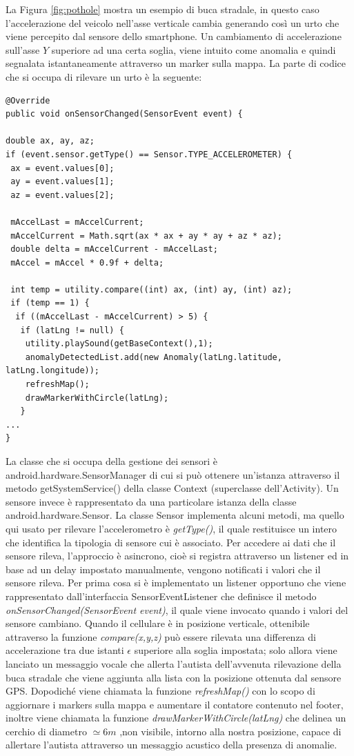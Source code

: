 \documentclass[a4paper, 11pt]{article} %
\begin{document}
La Figura \ref{fig:pothole} mostra un esempio di buca stradale, in questo caso l'accelerazione del veicolo nell'asse verticale cambia generando così un urto che viene percepito dal sensore dello smartphone. Un cambiamento di accelerazione sull'asse $Y$ superiore ad una certa soglia, viene intuito come anomalia e quindi segnalata istantaneamente attraverso un marker sulla mappa. La parte di codice che si occupa di rilevare un urto è la seguente: 
\begin{lstlisting}
@Override
public void onSensorChanged(SensorEvent event) {

double ax, ay, az;
if (event.sensor.getType() == Sensor.TYPE_ACCELEROMETER) {
 ax = event.values[0];
 ay = event.values[1];
 az = event.values[2];
 
 mAccelLast = mAccelCurrent;
 mAccelCurrent = Math.sqrt(ax * ax + ay * ay + az * az);
 double delta = mAccelCurrent - mAccelLast;
 mAccel = mAccel * 0.9f + delta;

 int temp = utility.compare((int) ax, (int) ay, (int) az);
 if (temp == 1) {
  if ((mAccelLast - mAccelCurrent) > 5) {
   if (latLng != null) {
    utility.playSound(getBaseContext(),1);
    anomalyDetectedList.add(new Anomaly(latLng.latitude, latLng.longitude));
    refreshMap();
    drawMarkerWithCircle(latLng);
   }
...
}
\end{lstlisting} 
La classe che si occupa della gestione dei sensori è android.hardware.SensorManager di cui si può ottenere un'istanza attraverso il metodo getSystemService() della classe Context (superclasse dell'Activity). Un sensore invece è rappresentato da una particolare istanza della classe android.hardware.Sensor. La classe Sensor implementa alcuni metodi, ma quello qui usato per rilevare l'accelerometro è \textit{getType()}, il quale restituisce un intero che identifica la tipologia di sensore cui è associato. Per accedere ai dati che il sensore rileva, l'approccio è asincrono, cioè si registra attraverso un listener ed in base ad un delay impostato manualmente, vengono notificati i valori che il sensore rileva. Per prima cosa si è implementato un listener opportuno che viene rappresentato dall'interfaccia SensorEventListener che definisce il metodo \textit{onSensorChanged(SensorEvent event)}, il quale viene invocato quando i valori del sensore cambiano. Quando il cellulare è in posizione verticale, ottenibile attraverso la funzione \textit{compare(x,y,z)} può essere rilevata una differenza di accelerazione tra due istanti $\epsilon$ superiore alla soglia impostata; solo allora viene lanciato un messaggio vocale che allerta l'autista dell'avvenuta rilevazione della buca stradale che viene aggiunta alla lista con la posizione ottenuta dal sensore GPS. Dopodiché viene chiamata la funzione \textit{refreshMap()} con lo scopo di aggiornare i markers sulla mappa e aumentare il contatore contenuto nel footer, inoltre viene chiamata la funzione \textit{drawMarkerWithCircle(latLng)} che delinea un cerchio di diametro $\simeq 6m$ ,non visibile, intorno alla nostra posizione, capace di allertare l'autista attraverso un messaggio acustico della presenza di anomalie.
\end{document}
